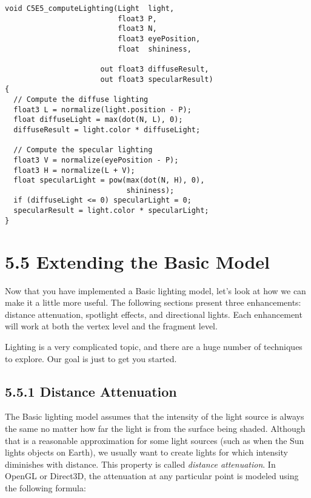 \documentclass[../main.tex]{subfiles}
\begin{document}
\FloatBarrier
\begin{lstlisting}[caption=Example 5-5. The C5E5_computeLighting Internal Function]
void C5E5_computeLighting(Light  light,
                          float3 P,
                          float3 N,
                          float3 eyePosition,
                          float  shininess,

                      out float3 diffuseResult,
                      out float3 specularResult)
{
  // Compute the diffuse lighting
  float3 L = normalize(light.position - P);
  float diffuseLight = max(dot(N, L), 0);
  diffuseResult = light.color * diffuseLight;

  // Compute the specular lighting
  float3 V = normalize(eyePosition - P);
  float3 H = normalize(L + V);
  float specularLight = pow(max(dot(N, H), 0),
                            shininess);
  if (diffuseLight <= 0) specularLight = 0;
  specularResult = light.color * specularLight;
}
\end{lstlisting}
\FloatBarrier

\section{5.5 Extending the Basic Model}

Now that you have implemented a Basic lighting model, let's look at how we can make it a little more useful. The following sections present three enhancements: distance attenuation, spotlight effects, and directional lights. Each enhancement will work at both the vertex level and the fragment level.

Lighting is a very complicated topic, and there are a huge number of techniques to explore. Our goal is just to get you started.

\subsection{5.5.1 Distance Attenuation}

The Basic lighting model assumes that the intensity of the light source is always the same no matter how far the light is from the surface being shaded. Although that is a reasonable approximation for some light sources (such as when the Sun lights objects on Earth), we usually want to create lights for which intensity diminishes with distance. This property is called \textit{distance attenuation}. In OpenGL or Direct3D, the attenuation at any particular point is modeled using the following formula:
\end{document}
